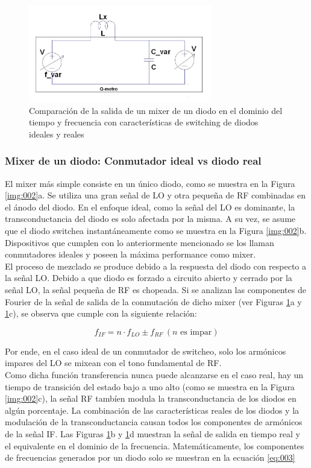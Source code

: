 \documentclass[a4paper,10pt]{article}
\begin{document}
	\begin{figure}[!htb]
		\centering
		\includegraphics[width=8cm]
		{Images/qmetro.png}
		\caption{Comparaci\'on de la salida de un mixer de un diodo en el 
		dominio del tiempo y frecuencia con características de switching 
		de diodos ideales y reales} 
		\label{img:003} 
	\end{figure}


	\subsubsection{Mixer de un diodo: Conmutador ideal vs diodo real}
	\indent El mixer más simple consiste en un único diodo, como se muestra en 
	la Figura \ref{img:002}a. Se utiliza una gran señal de LO y otra pequeña de 
	RF combinadas en el ánodo del diodo. En el enfoque ideal, como la señal del 
	LO es dominante, la transconductancia del diodo es solo afectada por la 
	misma. A su vez, se asume que el diodo switchea instantáneamente como se 
	muestra en la Figura \ref{img:002}b. Dispositivos que cumplen con lo 
	anteriormente mencionado se los llaman conmutadores ideales y poseen la 
	máxima performance como mixer. \\
	\indent El proceso de mezclado se produce debido a la respuesta del diodo 
	con respecto a la señal LO. Debido a que diodo es forzado a circuito abierto 
	y cerrado por la señal LO, la señal pequeña de RF es chopeada. Si se 
	analizan las componentes de Fourier de la señal de salida de la conmutación 
	de dicho mixer (ver Figuras \ref{img:003}a y \ref{img:003}c), se observa que
	cumple con la siguiente relación:

	\begin{equation*}
		f_{IF} = n\cdot f_{LO}\pm f_{RF}~(n\text{ es impar})
	\end{equation*}

	\indent Por ende, en el caso ideal de un conmutador de switcheo, solo los 
	armónicos impares del LO se mixean con el tono fundamental de RF. \\
	\indent Como dicha función transferencia nunca puede alcanzarse en el caso 
	real, hay un tiempo de transición del estado bajo a uno alto (como se 
	muestra en la Figura \ref{img:002}c), la señal RF tambíen modula la 
	transconductancia de los diodos en algún porcentaje. La combinación de las 
	características reales de los diodos y la modulación de la transconductancia
	causan todos los componentes de armónicos de la señal IF. Las Figuras 
	\ref{img:003}b y \ref{img:003}d muestran la señal de salida en tiempo real y
	el equivalente en el dominio de la frecuencia. Matemáticamente, los 
	componentes de frecuencias generados por un diodo solo se muestran en la 
	ecuación \ref{eq:003}
\end{document}
